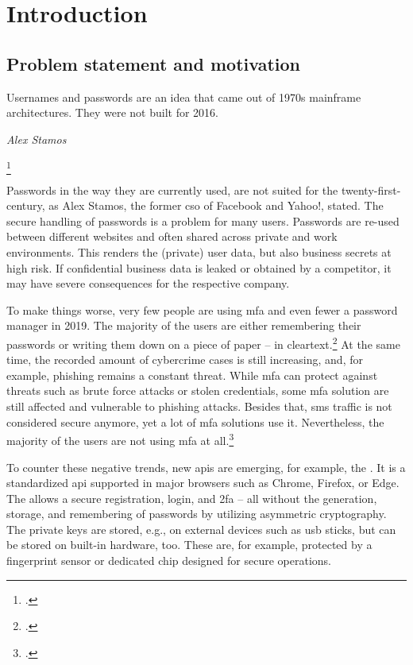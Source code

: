 \chapter{Introduction}
\label{chapter:introduction}

\section{Problem statement and motivation}

\setlength{}
\epigraph{\frqq Usernames and passwords are an idea that came out of 1970s mainframe architectures. They were not built for 2016.\flqq\footnotemark}{\textit{Alex Stamos}}
\footcitetext[See][]{stamos}

Passwords in the way they are currently used, are not suited for the twenty-first-century, as Alex Stamos, the former \gls{cso} of Facebook and Yahoo!, stated. The secure handling of passwords is a problem for many users. Passwords are re-used between different websites and often shared across private and work environments. This renders the (private) user data, but also business secrets at high risk. If confidential business data is leaked or obtained by a competitor, it may have severe consequences for the respective company.

To make things worse, very few people are using \gls{mfa} and even fewer a password manager in 2019. The majority of the users are either remembering their passwords or writing them down on a piece of paper -- in cleartext.\footcites[See][]{ibm-security}[See][]{web-de-passwords}
At the same time, the recorded amount of cybercrime cases is still increasing, and, for example, phishing remains a constant threat. While \gls{mfa} can protect against threats such as brute force attacks or stolen credentials, some \gls{mfa} solution are still affected and vulnerable to phishing attacks. Besides that, \gls{sms} traffic is not considered secure anymore, yet a lot of \gls{mfa} solutions use it. Nevertheless, the majority of the users are not using \gls{mfa} at all.\footcites[See][]{infratest-dimap}[See][6--7]{bka-cybercrime}[See][58]{dotson2019practical}

To counter these negative trends, new \glspl{api} are emerging, for example, the \wa. It is a standardized \gls{api} supported in major browsers such as Chrome, Firefox, or Edge. The \wa{} allows a secure registration, login, and \gls{2fa} -- all without the generation, storage, and remembering of passwords by utilizing asymmetric cryptography. The private keys are stored, e.g., on external devices such as \gls{usb} sticks, but can be stored on built-in hardware, too. These are, for example, protected by a fingerprint sensor or dedicated chip designed for secure operations.

